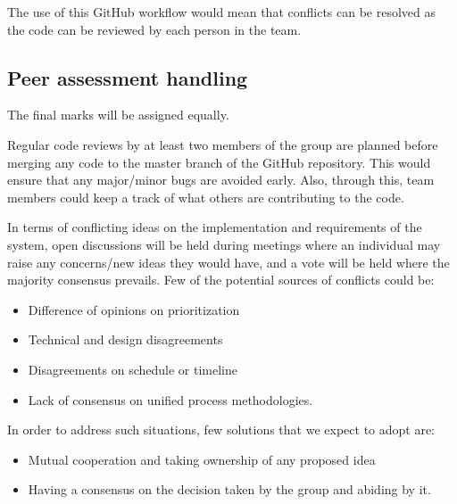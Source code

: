\documentclass[11pt,a4paper]{article}
\begin{document}
The use of this GitHub workflow would mean that conflicts can be resolved as the code can be reviewed by each person in the team. 

\subsection{Peer assessment handling}

The final marks will be assigned equally.

Regular code reviews by at least two members of the group are planned before merging any code to the master branch of the GitHub repository. This would ensure that any major/minor bugs are avoided early. Also, through this, team members could keep a track of what others are contributing to the code.

In terms of conflicting ideas on the implementation and requirements of the system, open discussions will be held during meetings where an individual may raise any concerns/new ideas they would have, and a vote will be held where the majority consensus prevails.
Few of the potential sources of conflicts could be:
\begin{itemize}
\item Difference of opinions on prioritization
\item Technical and design disagreements
\item Disagreements on schedule or timeline
\item Lack of consensus on unified process methodologies.
\end{itemize}
In order to address such situations, few solutions that we expect to adopt are:
\begin{itemize}
\item Mutual cooperation and taking ownership of any proposed idea
\item Having a consensus on the decision taken by the group and abiding by it.
\end{itemize}








%
%
%
%
\end{document}
